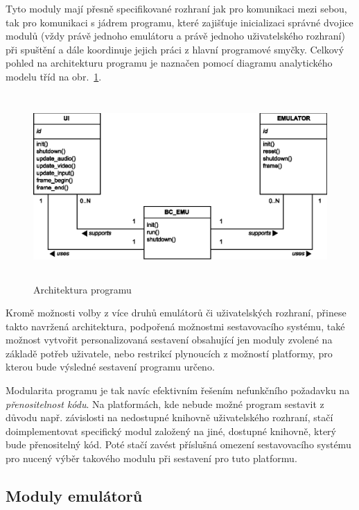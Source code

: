 Tyto moduly mají přesně specifikované rozhraní jak pro komunikaci mezi sebou,
tak pro komunikaci s jádrem programu, které zajišťuje inicializaci správné
dvojice modulů (vždy právě jednoho emulátoru a právě jednoho uživatelského
rozhraní) při spuštění a dále koordinuje jejich práci z hlavní programové
smyčky. Celkový pohled na architekturu programu je naznačen pomocí diagramu
analytického modelu tříd na obr.~\ref{fig:anal_arch}.

\begin{figure}[ht]
\begin{center}
\includegraphics[width=14.2cm,height=7.1cm]{fig/anal_model}
\caption{Architektura programu\label{fig:anal_arch}}
\end{center}
\end{figure}

Kromě možnosti volby z více druhů emulátorů či uživatelských rozhraní, přinese
takto navržená architektura, podpořená možnostmi sestavovacího systému, také
možnost vytvořit personalizovaná sestavení obsahující jen moduly zvolené na
základě potřeb uživatele, nebo restrikcí plynoucích z možností platformy, pro
kterou bude výsledné sestavení programu určeno.

Modularita programu je tak navíc efektivním řešením nefunkčního požadavku na
{\em přenositelnost kódu}. Na platformách, kde nebude možné program sestavit z
důvodu např. závislosti na nedostupné knihovně uživatelského rozhraní, stačí
doimplementovat specifický modul založený na jiné, dostupné knihovně, který
bude  přenositelný kód. Poté stačí zavést příslušná omezení
sestavovacího systému pro nucený výběr takového modulu při sestavení pro tuto
platformu.

%
%

\subsection{Moduly emulátorů}

